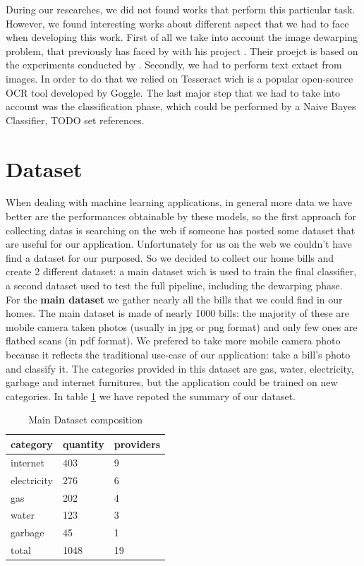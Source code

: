 \documentclass[10pt,twocolumn,letterpaper]{article}
\begin{document}
During our researches, we did not found works that perform this
particular task. However, we found interesting works about different
aspect that we had to face when developing this work.  First of all we
take into account the image dewarping problem, that previously has
faced by \cite{Improvingcamera-based} with his project
\cite{mobile-ocr}. Their proejct is based on the experiments conducted
by \cite{recoveringhomography}.  Secondly, we had to perform text
extact from images. In order to do that we relied on Tesseract
\cite{Tesseract} wich is a popular open-source OCR tool developed by
Goggle. The last major step that we had to take into account was the
classification phase, which could be performed by a Naive Bayes
Classifier, TODO set references.

\section{Dataset}
\label{sec:dataset}
When dealing with machine learning applications, in general more data we have  better are the performances obtainable by these models, so the first approach for collecting datas is searching on the web if someone has posted some dataset that are useful for our application. Unfortunately for us on the web we couldn't have find a dataset for our purposed. So we decided to collect our home bills and create 2 different dataset: a main dataset wich is used to train the final classifier, a second dataset used to test the full pipeline, including the dewarping phase.\\

For the \textbf{main dataset} we gather nearly all the bills that we could find in our homes. The main dataset is made of nearly 1000 bills: the majority of these are mobile camera taken photos (usually in jpg or png format) and only few ones are flatbed scans (in pdf format). We prefered to take more mobile camera photo because it reflects the traditional use-case of our application: take a bill's photo and classify it. The categories provided in this dataset are gas, water, electricity, garbage and internet furnitures, but the application could be trained on new categories. In table \ref{dataset-table} we have repoted the summary of our dataset.


\begin{table}[!h]
	\begin{center}
		\begin{tabular}{lll}
			\hline
			category    & quantity & providers \\ \hline
			internet    & 403      & 9         \\
			electricity & 276      & 6         \\
			gas         & 202      & 4         \\
			water       & 123      & 3         \\
			garbage     & 45       & 1         \\ \hline
			total       & 1048     & 19        \\ \hline
		\end{tabular}
	\end{center}
	\label{dataset-table}
	\caption{Main Dataset composition}
\end{table}
\end{document}
